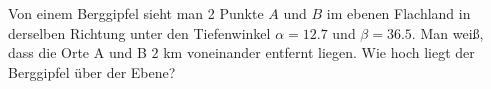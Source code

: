 
Von einem Berggipfel sieht man 2 Punkte $A$ und $B$ im ebenen Flachland in derselben
Richtung unter den Tiefenwinkel $\alpha = 12.7$ und $\beta = 36.5$. Man weiß, dass die
Orte A und B $2$ km voneinander entfernt liegen. Wie hoch liegt der Berggipfel über
der Ebene?